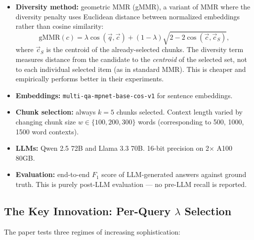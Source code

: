 \documentclass[11pt,a4paper]{article}
\begin{document}
\begin{itemize}[leftmargin=*]
	\item \textbf{Diversity method:} geometric MMR (gMMR), a variant of MMR where the diversity penalty uses Euclidean distance between normalized embeddings rather than cosine similarity:
	      \[
		      \text{gMMR}(c) = \lambda \cos(\vec{q}, \vec{c}) + (1 - \lambda)\sqrt{2 - 2\cos(\vec{c}, \vec{c}_S)},
	      \]
	      where $\vec{c}_S$ is the centroid of the already-selected chunks. The diversity term measures distance from the candidate to the \emph{centroid} of the selected set, not to each individual selected item (as in standard MMR). This is cheaper and empirically performs better in their experiments.
	\item \textbf{Embeddings:} \texttt{multi-qa-mpnet-base-cos-v1} for sentence embeddings.
	\item \textbf{Chunk selection:} always $k = 5$ chunks selected. Context length varied by changing chunk size $w \in \{100, 200, 300\}$ words (corresponding to 500, 1000, 1500 word contexts).
	\item \textbf{LLMs:} Qwen 2.5 72B and Llama 3.3 70B. 16-bit precision on 2$\times$ A100 80GB.
	\item \textbf{Evaluation:} end-to-end $F_1$ score of LLM-generated answers against ground truth. This is purely post-LLM evaluation --- no pre-LLM recall is reported.
\end{itemize}

\subsection{The Key Innovation: Per-Query $\lambda$ Selection}

The paper tests three regimes of increasing sophistication:
\end{document}
